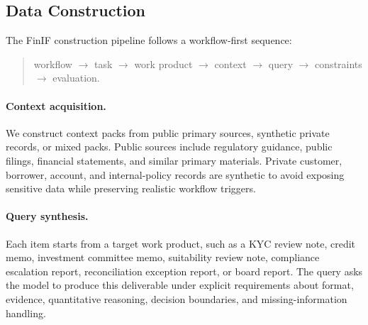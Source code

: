 \begin{table}[t]
\centering
\small
{}
\caption{Workflow coverage of FinIF-Train and FinIF-Test.}
\label{tab:workflow}
\end{table}

\subsection{Data Construction}

The FinIF construction pipeline follows a workflow-first sequence:
\begin{quote}
\small
workflow $\rightarrow$ task $\rightarrow$ work product $\rightarrow$ context $\rightarrow$ query $\rightarrow$ constraints $\rightarrow$ evaluation.
\end{quote}

\paragraph{Context acquisition.}
We construct context packs from public primary sources, synthetic private records, or mixed packs.
Public sources include regulatory guidance, public filings, financial statements, and similar primary materials.
Private customer, borrower, account, and internal-policy records are synthetic to avoid exposing sensitive data while preserving realistic workflow triggers.

\paragraph{Query synthesis.}
Each item starts from a target work product, such as a KYC review note, credit memo, investment committee memo, suitability review note, compliance escalation report, reconciliation exception report, or board report.
The query asks the model to produce this deliverable under explicit requirements about format, evidence, quantitative reasoning, decision boundaries, and missing-information handling.

